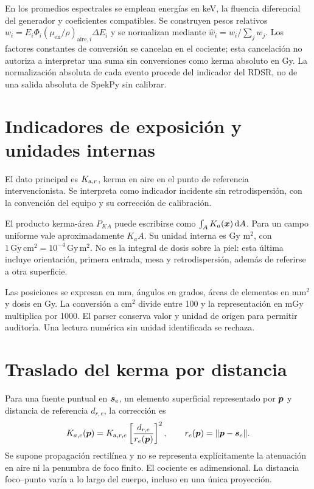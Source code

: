 En los promedios espectrales se emplean energías en keV, la fluencia diferencial del generador y coeficientes compatibles. Se construyen pesos relativos $w_i=E_i\Phi_i(\mu_{\mathrm{en}}/\rho)_{\mathrm{aire},i}\Delta E_i$ y se normalizan mediante $\widehat w_i=w_i/\sum_jw_j$. Los factores constantes de conversión se cancelan en el cociente; esta cancelación no autoriza a interpretar una suma sin conversiones como kerma absoluto en Gy. La normalización absoluta de cada evento procede del indicador del RDSR, no de una salida absoluta de SpekPy sin calibrar.

\section{Indicadores de exposición y unidades internas}
El dato principal es $K_{\mathrm{a},r}$, kerma en aire en el punto de referencia intervencionista. Se interpreta como indicador incidente sin retrodispersión, con la convención del equipo y su corrección de calibración.

El producto kerma-área $P_{KA}$ puede escribirse como $\int_A K_a(\bm{x})\,\mathrm dA$. Para un campo uniforme vale aproximadamente $K_a A$. Su unidad interna es Gy m$^2$, con $1\,\mathrm{Gy\,cm^2}=10^{-4}\,\mathrm{Gy\,m^2}$. No es la integral de dosis sobre la piel: esta última incluye orientación, primera entrada, mesa y retrodispersión, además de referirse a otra superficie.

Las posiciones se expresan en mm, ángulos en grados, áreas de elementos en mm$^2$ y dosis en Gy. La conversión a cm$^2$ divide entre 100 y la representación en mGy multiplica por 1000. El parser conserva valor y unidad de origen para permitir auditoría. Una lectura numérica sin unidad identificada se rechaza.

\section{Traslado del kerma por distancia}
Para una fuente puntual en $\bm{s}_e$, un elemento superficial representado por $\bm{p}$ y distancia de referencia $d_{r,e}$, la corrección es
\begin{equation}\label{eq:inverse}
K_{a,e}(\bm{p})=K_{\mathrm{a},r,e}\left[\frac{d_{r,e}}{r_e(\bm{p})}\right]^2,
\qquad r_e(\bm{p})=\|\bm{p}-\bm{s}_e\|.
\end{equation}
Se supone propagación rectilínea y no se representa explícitamente la atenuación en aire ni la penumbra de foco finito. El cociente es adimensional. La distancia foco--punto varía a lo largo del cuerpo, incluso en una única proyección.

